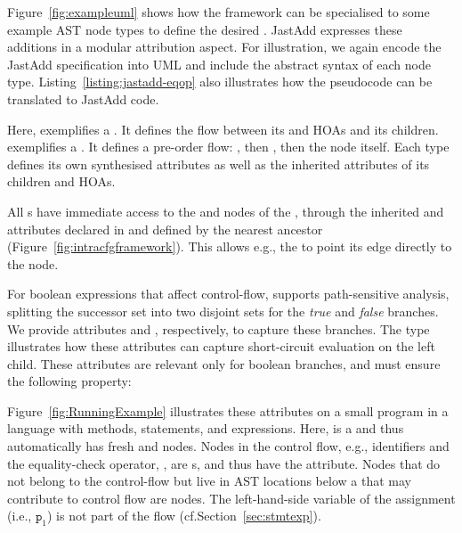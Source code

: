 Figure~\ref{fig:exampleuml} shows how the framework can be specialised to some example AST node types to define the desired \CFG.
JastAdd expresses these additions in a modular attribution aspect.
For illustration, we again encode the JastAdd specification into UML and include the abstract syntax of each node type.
Listing~\ref{listing:jastadd-eqop} also illustrates how the pseudocode can be translated to JastAdd code.

Here,  exemplifies a .
It defines the flow between its  and  HOAs and its children.
 exemplifies a .
It defines a pre-order flow: , then , then the node itself.
Each type defines its own synthesised attributes as well as the inherited attributes of its children and HOAs.

All s have immediate access to the  and  nodes of the \CFG, through
the inherited  and  attributes declared in  and defined by the nearest  ancestor (Figure~\ref{fig:intracfgframework}).
This allows e.g., the  to point its  edge directly to the  node.

For boolean expressions that affect control-flow, {\intracfg} supports path-sensitive analysis, splitting the successor set into two disjoint sets for the \emph{true} and \emph{false} branches.
We provide attributes  and , respectively, to capture these branches.
The  type illustrates how these attributes can capture short-circuit evaluation on the left child.
These attributes are relevant only for boolean branches, and must ensure the following property:\\

Figure~\ref{fig:RunningExample} illustrates these attributes on a small program in a language with methods, statements, and expressions.
Here,  is a  and thus automatically has fresh  and  nodes.
Nodes in the control flow, e.g., identifiers and the equality-check operator, , are s, and thus have the  attribute.
Nodes that do not belong to the control-flow but live in AST locations below a  that may contribute to control flow are  nodes.
The left-hand-side variable of the assignment  (i.e., $\texttt{p}_1$) is not part of the flow (cf.\@ Section~\ref{sec:stmtexp}).

